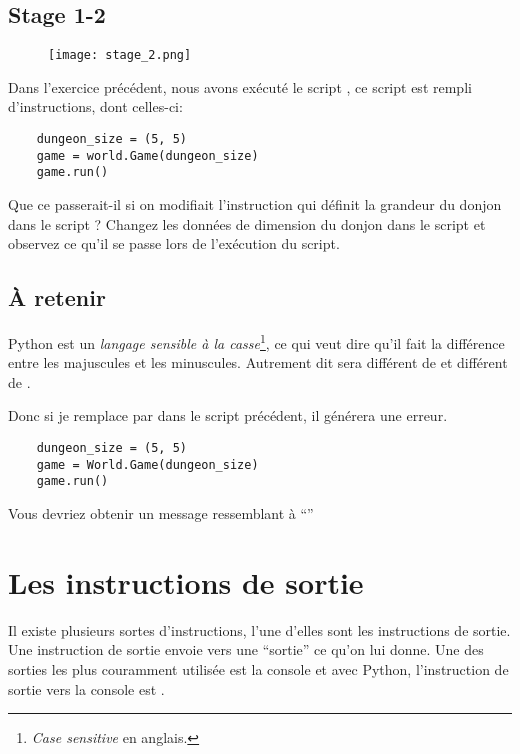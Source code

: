 \subsection{Stage 1-2}
\begin{figure}[ht]
\texttt{[image: stage\_2.png]} 
\end{figure}

Dans l’exercice précédent, nous avons exécuté le script , ce script est rempli d’instructions, dont celles-ci:

\begin{lstlisting}
    dungeon_size = (5, 5)
    game = world.Game(dungeon_size)
    game.run()
\end{lstlisting}

Que ce passerait-il si on modifiait l’instruction qui définit la grandeur du donjon dans le script ?
Changez les données de dimension du donjon dans le script et observez ce qu'il se passe lors de l'exécution du script.

\subsection{\`{A} retenir}

Python est un \emph{langage sensible à la casse}\footnote{\textit{Case sensitive} en anglais.}, ce qui veut dire qu'il fait la différence entre les majuscules et les minuscules. Autrement dit  sera différent de  et  différent de .

Donc si je remplace  par  dans le script précédent, il générera une erreur.

\begin{lstlisting}
    dungeon_size = (5, 5)
    game = World.Game(dungeon_size)
    game.run()
\end{lstlisting}

Vous devriez obtenir un message ressemblant à ``''

\section{Les instructions de sortie}

Il existe plusieurs sortes d’instructions, l’une d’elles sont les instructions de sortie.
Une instruction de sortie envoie vers une “sortie” ce qu’on lui donne.
Une des sorties les plus couramment utilisée est la console et avec Python, l’instruction de sortie vers la console est .

